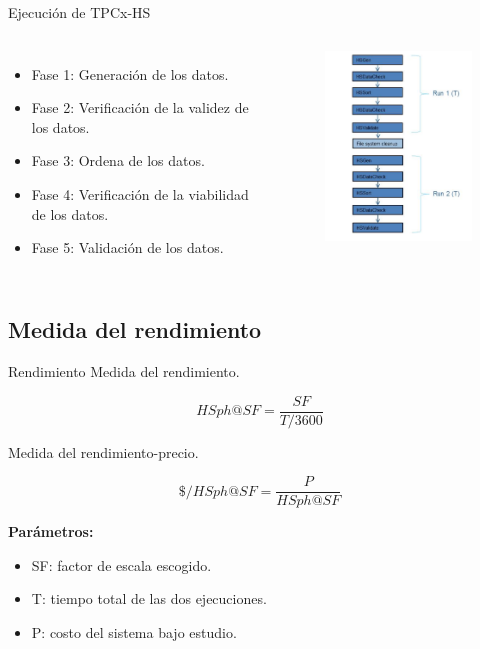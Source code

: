 		\begin{frame}{Ejecución de TPCx-HS}
				\begin{columns}[c]
					
					\begin{itemize}
						\item Fase 1: Generación de los datos.
						\item Fase 2: Verificación de la validez de los datos.
						\item Fase 3: Ordena de los datos.
						\item Fase 4: Verificación de la viabilidad de los datos.
						\item Fase 5: Validación de los datos.
					\end{itemize}
					
					\begin{figure}[H]
						\centering
						\includegraphics[width=5cm]{./Images/executionsTPC.png}
					\end{figure}

				\end{columns}
	
		\end{frame}
		
	\subsection*{Medida del rendimiento}	
			
		\begin{frame}{Rendimiento}		
			{\color{ChetwodeBlue}\large Medida del rendimiento.}
								
					$$ HSph@SF = \frac{SF}{T/3600} $$				
				
			{\color{ChetwodeBlue}\large Medida del rendimiento-precio.}
			
					$$ \$/HSph@SF = \frac{P}{HSph@SF} $$
					
			\begin{tcolorbox}[colback=blue!5,colframe=blue!15]
				\textbf{Parámetros:}
		
				\begin{itemize}
					\fontsize{10}{10}\selectfont
					\item SF: factor de escala escogido.
					\item T: tiempo total de las dos ejecuciones.
					\item P: costo del sistema bajo estudio.
				\end{itemize}
			\end{tcolorbox}
		\end{frame}
				 